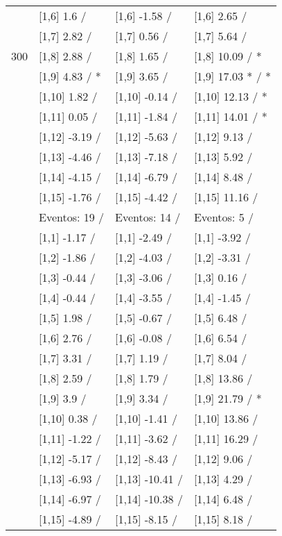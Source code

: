 \begin{table}
\begin{tabular}[t]{llll}
 & {}[1,6] 1.6  / & {}[1,6] -1.58  / & {}[1,6] 2.65  /\\
 & {}[1,7] 2.82  / & {}[1,7] 0.56  / & {}[1,7] 5.64  /\\
300 & {}[1,8] 2.88  / & {}[1,8] 1.65  / & {}[1,8] 10.09  / *\\
\addlinespace
 & {}[1,9] 4.83  / * & {}[1,9] 3.65  / & {}[1,9] 17.03 * / *\\
 & {}[1,10] 1.82  / & {}[1,10] -0.14  / & {}[1,10] 12.13  / *\\
 & {}[1,11] 0.05  / & {}[1,11] -1.84  / & {}[1,11] 14.01  / *\\
 & {}[1,12] -3.19  / & {}[1,12] -5.63  / & {}[1,12] 9.13  /\\
 & {}[1,13] -4.46  / & {}[1,13] -7.18  / & {}[1,13] 5.92  /\\
\addlinespace
 & {}[1,14] -4.15  / & {}[1,14] -6.79  / & {}[1,14] 8.48  /\\
 & {}[1,15] -1.76  / & {}[1,15] -4.42  / & {}[1,15] 11.16  /\\
 & Eventos:  19 / & Eventos:  14 / & Eventos:  5 /\\
 & {}[1,1] -1.17  / & {}[1,1] -2.49  / & {}[1,1] -3.92  /\\
 & {}[1,2] -1.86  / & {}[1,2] -4.03  / & {}[1,2] -3.31  /\\
\addlinespace
 & {}[1,3] -0.44  / & {}[1,3] -3.06  / & {}[1,3] 0.16  /\\
 & {}[1,4] -0.44  / & {}[1,4] -3.55  / & {}[1,4] -1.45  /\\
 & {}[1,5] 1.98  / & {}[1,5] -0.67  / & {}[1,5] 6.48  /\\
 & {}[1,6] 2.76  / & {}[1,6] -0.08  / & {}[1,6] 6.54  /\\
 & {}[1,7] 3.31  / & {}[1,7] 1.19  / & {}[1,7] 8.04  /\\
\addlinespace
500 & {}[1,8] 2.59  / & {}[1,8] 1.79  / & {}[1,8] 13.86  /\\
 & {}[1,9] 3.9  / & {}[1,9] 3.34  / & {}[1,9] 21.79  / *\\
 & {}[1,10] 0.38  / & {}[1,10] -1.41  / & {}[1,10] 13.86  /\\
 & {}[1,11] -1.22  / & {}[1,11] -3.62  / & {}[1,11] 16.29  /\\
 & {}[1,12] -5.17  / & {}[1,12] -8.43  / & {}[1,12] 9.06  /\\
\addlinespace
 & {}[1,13] -6.93  / & {}[1,13] -10.41  / & {}[1,13] 4.29  /\\
 & {}[1,14] -6.97  / & {}[1,14] -10.38  / & {}[1,14] 6.48  /\\
 & {}[1,15] -4.89  / & {}[1,15] -8.15  / & {}[1,15] 8.18  /\\
\bottomrule
\end{tabular}
\end{table}
